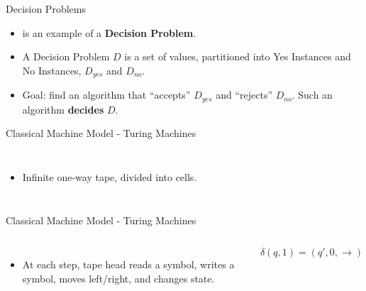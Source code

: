 \documentclass[c]{beamer}
\begin{document}
\begin{frame}{Decision Problems}

  \begin{itemize}
  \item[] \subsum{} is an example of a \textbf{Decision Problem}.\pause

    \vspace{\baselineskip}

  \item[] A Decision Problem $D$ is a set of values, partitioned into
    Yes Instances and No Instances, $D_{yes}$ and $D_{no}$.

    \vspace{\baselineskip}

  \item[] Goal: find an algorithm that ``accepts'' $D_{yes}$ and
    ``rejects'' $D_{no}$.  Such an algorithm \textbf{decides} $D$.
  \end{itemize}

\end{frame}

\begin{frame}{Classical Machine Model - Turing Machines}
  \begin{columns}

    \begin{itemize}
    \item[] Infinite one-way tape, divided into cells.    
    \end{itemize}
  \end{columns}
\end{frame}

\begin{frame}{Classical Machine Model - Turing Machines}
  \begin{columns}

    \begin{itemize}
    \item At each step, tape head reads a symbol, writes a symbol,
      moves left/right, and changes state.
    \end{itemize}
    
    $$\delta(q, 1) = (q', 0, \rightarrow)$$
  \end{columns}
\end{frame}
\end{document}
